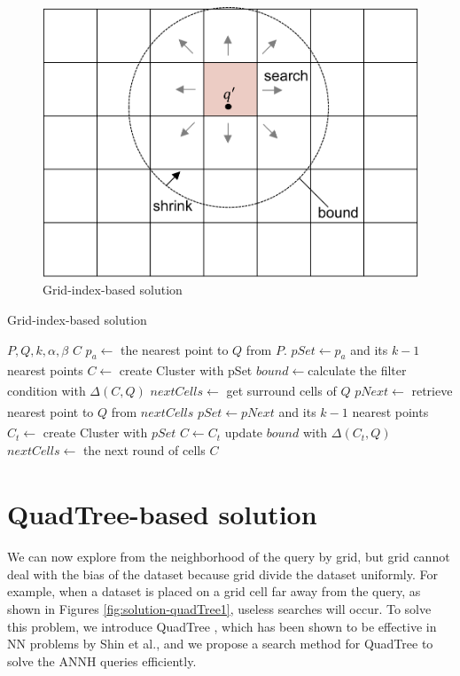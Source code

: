 \documentclass[a4paper,11pt]{report}
\theoremstyle{mytheoremstyle}
\begin{document}
\begin{figure}
\includegraphics[width=\textwidth]{images/solution-grid.pdf}
\caption{Grid-index-based solution} \label{fig:solution-grid}
\end{figure}


\begin{algorithm}                      
\caption{Grid-index-based solution}         
\label{alg:grid}
\begin{algorithmic}[1]                  
\renewcommand{\algorithmicrequire}{\textbf{Input:}}
\renewcommand{\algorithmicensure}{\textbf{Output:}}
\REQUIRE $P,Q,k,\alpha, \beta$
\ENSURE $C$
\STATE $p_a \xleftarrow[]{}$ the nearest point to $Q$ from $P$.
\STATE $pSet \xleftarrow{} p_a$ and its $k-1$ nearest points
\STATE $C \xleftarrow[]{}$ create Cluster with pSet
\STATE $bound \xleftarrow[]{} $calculate the filter condition with $\Delta(C,Q)$
\STATE $nextCells \xleftarrow[]{} $ get surround cells of $Q$
\STATE $pNext \xleftarrow[]{}$ retrieve nearest point to $Q$ from $nextCells$
\STATE $pSet \xleftarrow[]{} pNext$ and its $k-1$ nearest points
\STATE $C_t \xleftarrow{}$ create Cluster with $pSet$
\STATE $C \xleftarrow{} C_t$
\STATE update $bound$ with $\Delta(C_t,Q)$
\ENDIF
\STATE $nextCells \xleftarrow[]{} $ the next round of cells
\ENDWHILE
\RETURN $C$
\end{algorithmic}
\end{algorithm}

\section{QuadTree-based solution}
We can now explore from the neighborhood of the query by grid, but grid cannot deal with the bias of the dataset because grid divide the dataset uniformly. For example, when a dataset is placed on a grid cell far away from the query, as shown in Figures \ref{fig:solution-quadTree1}, useless searches will occur. To solve this problem, we introduce QuadTree \cite{finkel1974quad}, which has been shown to be effective in NN problems by Shin et al.\cite{shin2019investigation}, and we propose a search method for QuadTree to solve the ANNH queries efficiently.
\end{document}
